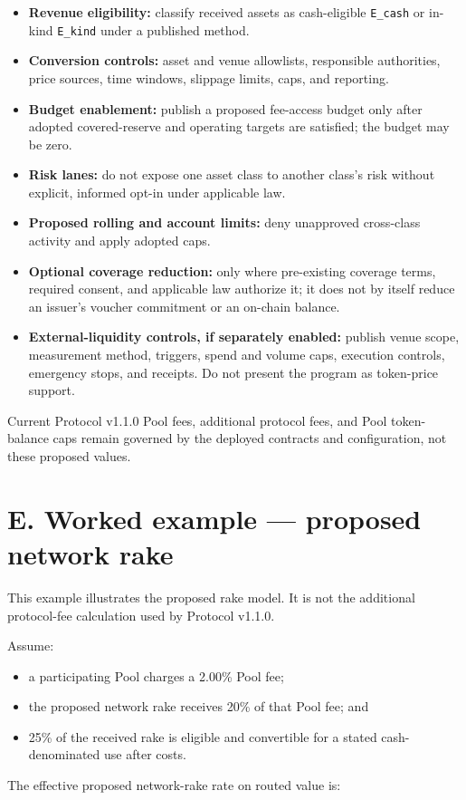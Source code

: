\documentclass[11pt]{article}
\begin{document}
\begin{itemize}[leftmargin=*]
\item \textbf{Revenue eligibility:} classify received assets as cash-eligible \texttt{E\_cash} or in-kind \texttt{E\_kind} under a published method.
\item \textbf{Conversion controls:} asset and venue allowlists, responsible authorities, price sources, time windows, slippage limits, caps, and reporting.
\item \textbf{Budget enablement:} publish a proposed fee-access budget only after adopted covered-reserve and operating targets are satisfied; the budget may be zero.
\item \textbf{Risk lanes:} do not expose one asset class to another class's risk without explicit, informed opt-in under applicable law.
\item \textbf{Proposed rolling and account limits:} deny unapproved cross-class activity and apply adopted caps.
\item \textbf{Optional coverage reduction:} only where pre-existing coverage terms, required consent, and applicable law authorize it; it does not by itself reduce an issuer's voucher commitment or an on-chain balance.
\item \textbf{External-liquidity controls, if separately enabled:} publish venue scope, measurement method, triggers, spend and volume caps, execution controls, emergency stops, and receipts. Do not present the program as token-price support.
\end{itemize}
Current Protocol v1.1.0 Pool fees, additional protocol fees, and Pool token-balance caps remain governed by the deployed contracts and configuration, not these proposed values.


\section*{E. Worked example --- proposed network rake}

This example illustrates the proposed rake model. It is not the additional protocol-fee calculation used by Protocol v1.1.0.

Assume:

\begin{itemize}[leftmargin=*]
\item a participating Pool charges a 2.00\% Pool fee;
\item the proposed network rake receives 20\% of that Pool fee; and
\item 25\% of the received rake is eligible and convertible for a stated cash-denominated use after costs.
\end{itemize}
The effective proposed network-rake rate on routed value is:
\end{document}
